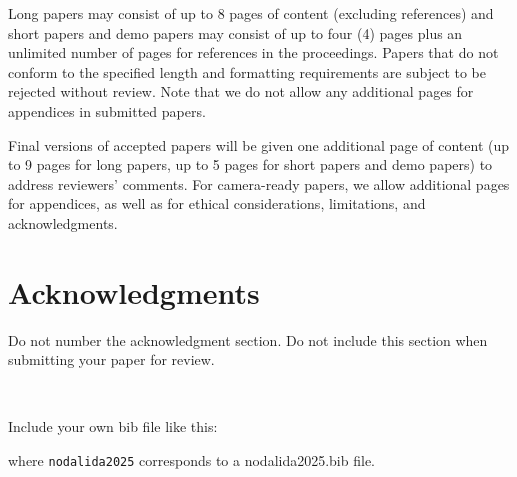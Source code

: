 \documentclass[11pt]{article}
\begin{document}
Long papers may consist of up to 8 pages of content (excluding
references) and short papers and demo papers may consist of up to 
four (4) pages plus an unlimited number of pages for references in the proceedings.  Papers that do not conform to the
specified length and formatting requirements are subject to be
rejected without review. Note that we do not allow any additional pages for appendices in submitted papers. 

Final versions of accepted papers will be given one additional page of content (up to 9 pages for long papers, up to 5 pages for short papers and demo papers) to address reviewers’ comments. For camera-ready papers, we allow additional pages for appendices, as well as for ethical considerations, limitations, and acknowledgments.

\section*{Acknowledgments}

Do not number the acknowledgment section. Do not include this section
when submitting your paper for review.

~


\noindent Include your own bib file like this:

\noindent \verb||
\verb|| 

\noindent where \verb|nodalida2025| corresponds to a nodalida2025.bib file.





\end{document}
